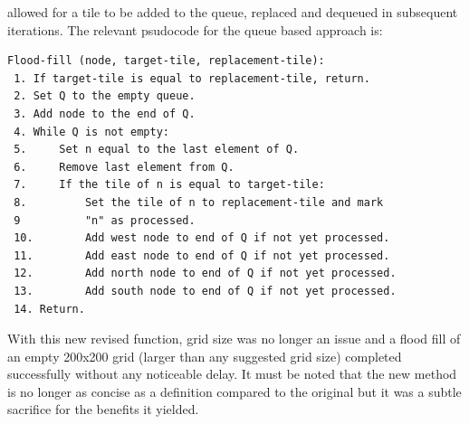 allowed for a tile to be added to the queue, replaced and dequeued in subsequent iterations. The relevant psudocode for the queue based approach is:

\begin{minipage}{0.9\textwidth}
	\begin{lstlisting}[caption={4-way queue based flood fill}, label={lst:queueFloodFill}]
Flood-fill (node, target-tile, replacement-tile):
 1. If target-tile is equal to replacement-tile, return.
 2. Set Q to the empty queue.
 3. Add node to the end of Q.
 4. While Q is not empty: 
 5.     Set n equal to the last element of Q.
 6.     Remove last element from Q.
 7.     If the tile of n is equal to target-tile:
 8.         Set the tile of n to replacement-tile and mark 
 9			"n" as processed.
 10.        Add west node to end of Q if not yet processed.
 11.        Add east node to end of Q if not yet processed.
 12.        Add north node to end of Q if not yet processed.
 13.        Add south node to end of Q if not yet processed.
 14. Return.
	\end{lstlisting}
\end{minipage}

With this new revised function, grid size was no longer an issue and a flood fill of an empty 200x200 grid (larger than any suggested grid size) completed successfully without any noticeable delay.  It must be noted that the new method is no longer as concise as a definition compared to the original but it was a subtle sacrifice for the benefits it yielded.



